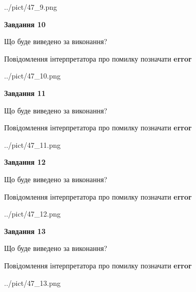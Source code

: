 \documentclass[11pt, ukrainian]{article}
\begin{document}
{\begin {large}
\begin{center}
	{../pict/47_9.png}
\end{center}
\newpage

{\begin {center}\textbf{Завдання 10}\end {center}}\par
Що буде виведено за виконання? \par
Повідомлення інтерпретатора про помилку позначати \textbf{error}

\begin{center}
	{../pict/47_10.png}
\end{center}
\newpage

{\begin {center}\textbf{Завдання 11}\end {center}}\par
Що буде виведено за виконання? \par
Повідомлення інтерпретатора про помилку позначати \textbf{error}

\begin{center}
	{../pict/47_11.png}
\end{center}
\newpage

{\begin {center}\textbf{Завдання 12}\end {center}}\par
Що буде виведено за виконання? \par
Повідомлення інтерпретатора про помилку позначати \textbf{error}

\begin{center}
	{../pict/47_12.png}
\end{center}
\newpage

{\begin {center}\textbf{Завдання 13}\end {center}}\par
Що буде виведено за виконання? \par
Повідомлення інтерпретатора про помилку позначати \textbf{error}

\begin{center}
	{../pict/47_13.png}
\end{center}
\newpage


\end{large}}
\end{document}
